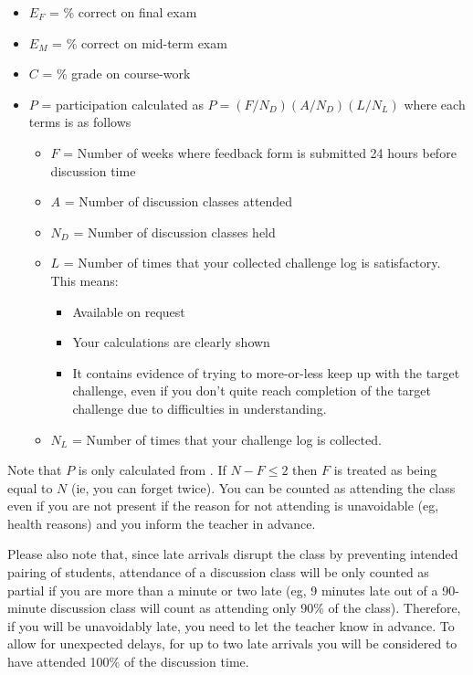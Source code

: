 \begin{itemize}
    \item $E_F$ = \% correct on final exam
    \item $E_M$ = \% correct on mid-term exam
    \item $C$ = \% grade on course-work
    \item $P$ = participation calculated as $P = (F/N_D)(A/N_D)(L/N_L)$ where each terms is as follows
        \begin{itemize}
            \item $F$ = Number of weeks where feedback form is submitted 24 hours before discussion time
            \item $A$ = Number of discussion classes attended
            \item $N_D$ = Number of discussion classes held
            \item $L$ = Number of times that your collected challenge log is satisfactory. This means:
                \begin{itemize}
                    \item Available on request
                    \item Your calculations are clearly shown
                    \item It contains evidence of trying to more-or-less keep up with the target challenge, even if you don't quite reach completion of the target challenge due to difficulties in understanding.
                \end{itemize}
            \item $N_L$ = Number of times that your challenge log is collected.
        \end{itemize}
\end{itemize}

Note that $P$ is only calculated from \assstart. If $N - F \le 2$ then $F$ is treated as being equal to $N$ (ie, you can forget twice). You can be counted as attending the class even if you are not present if the reason for not attending is unavoidable (eg, health reasons) and you inform the teacher in advance.

Please also note that, since late arrivals disrupt the class by preventing intended pairing of students, attendance of a discussion class will be only counted as partial if you are more than a minute or two late (eg, 9 minutes late out of a 90-minute discussion class will count as attending only 90\% of the class). Therefore, if you will be unavoidably late, you need to let the teacher know in advance. To allow for unexpected delays, for up to two late arrivals you will be considered to have attended 100\% of the discussion time.

